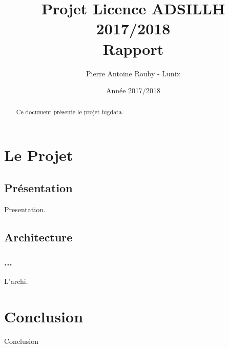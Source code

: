 \documentclass[12pt]{report}
\title{Projet Licence ADSILLH 2017/2018\\Rapport}
\author{Pierre Antoine Rouby - Lunix}
\date{Année 2017/2018}
\begin{document}
\maketitle

\begin{abstract}
Ce document présente le projet bigdata.
\end{abstract}

\tableofcontents

\chapter{Le Projet}
\section{Présentation}
Presentation.

\section{Architecture} 
\subsection{...}
L'archi.
\newpage

\chapter{Conclusion}
Conclusion
\end{document}

